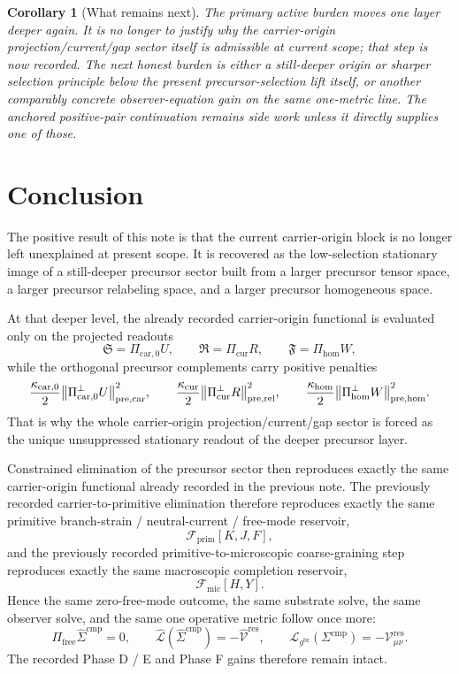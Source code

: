 \documentclass[11pt]{article}
\newcommand{\ObserverMetric}{g^{\mathrm{br}}}
\newcommand{\CompShift}{\Sigma^{\mathrm{cmp}}}
\newcommand{\CompLift}{\widehat\Sigma^{\mathrm{cmp}}}
\newcommand{\ResidualCore}{\mathcal V_{\mu\nu}^{\mathrm{res}}}
\newcommand{\ResidualLift}{\widehat{\mathcal V}^{\mathrm{res}}}
\newcommand{\SubReducedEin}{\widehat{\mathcal L}}
\newcommand{\FreeProj}{\Pi_{\mathrm{free}}}
\newcommand{\GaugeAux}{Y}
\newcommand{\ReducedEin}{\mathcal L_{\ObserverMetric}}
\newcommand{\MicFunctional}{\mathscr F_{\mathrm{mic}}}
\newcommand{\PrimFunctional}{\mathscr F_{\mathrm{prim}}}
\newcommand{\PrimStrain}{K}
\newcommand{\PrimNeutral}{J}
\newcommand{\PrimFree}{F}
\newcommand{\CarrierSeed}{\mathfrak S}
\newcommand{\RelabelSeed}{\mathfrak R}
\newcommand{\FreeSeed}{\mathfrak F}
\newcommand{\PreTensor}{U}
\newcommand{\PreRelabel}{R}
\newcommand{\PreFree}{W}
\newcommand{\PreCarProj}{\Pi_{\mathrm{car},0}}
\newcommand{\PreCarPerp}{\Pi_{\mathrm{car},0}^{\perp}}
\newcommand{\CurrentProj}{\Pi_{\mathrm{cur}}}
\newcommand{\CurrentPerp}{\Pi_{\mathrm{cur}}^{\perp}}
\newcommand{\FreeReadProj}{\Pi_{\mathrm{hom}}}
\newcommand{\FreeReadPerp}{\Pi_{\mathrm{hom}}^{\perp}}
\newcommand{\PreCarGap}{\kappa_{\mathrm{car},0}}
\newcommand{\CurrentGap}{\kappa_{\mathrm{cur}}}
\newcommand{\HomGap}{\kappa_{\mathrm{hom}}}
\newtheorem{corollary}{Corollary}
\begin{document}
\begin{corollary}[What remains next]
The primary active burden moves one layer deeper again. It is no longer to justify why the carrier-origin projection/current/gap sector itself is admissible at current scope; that step is now recorded. The next honest burden is either a still-deeper origin or sharper selection principle below the present precursor-selection lift itself, or another comparably concrete observer-equation gain on the same one-metric line. The anchored positive-pair continuation remains side work unless it directly supplies one of those.
\end{corollary}

\section{Conclusion}

The positive result of this note is that the current carrier-origin block is no longer left unexplained at present scope. It is recovered as the low-selection stationary image of a still-deeper precursor sector built from a larger precursor tensor space, a larger precursor relabeling space, and a larger precursor homogeneous space.

At that deeper level, the already recorded carrier-origin functional is evaluated only on the projected readouts
\[
\CarrierSeed=\PreCarProj\PreTensor,
\qquad
\RelabelSeed=\CurrentProj\PreRelabel,
\qquad
\FreeSeed=\FreeReadProj\PreFree,
\]
while the orthogonal precursor complements carry positive penalties
\[
\frac{\PreCarGap}{2}\norm{\PreCarPerp\PreTensor}_{\mathrm{pre,car}}^2,
\qquad
\frac{\CurrentGap}{2}\norm{\CurrentPerp\PreRelabel}_{\mathrm{pre,rel}}^2,
\qquad
\frac{\HomGap}{2}\norm{\FreeReadPerp\PreFree}_{\mathrm{pre,hom}}^2.
\]
That is why the whole carrier-origin projection/current/gap sector is forced as the unique unsuppressed stationary readout of the deeper precursor layer.

Constrained elimination of the precursor sector then reproduces exactly the same carrier-origin functional already recorded in the previous note. The previously recorded carrier-to-primitive elimination therefore reproduces exactly the same primitive branch-strain / neutral-current / free-mode reservoir,
\[
\PrimFunctional[\PrimStrain,\PrimNeutral,\PrimFree],
\]
and the previously recorded primitive-to-microscopic coarse-graining step reproduces exactly the same macroscopic completion reservoir,
\[
\MicFunctional[H,\GaugeAux].
\]
Hence the same zero-free-mode outcome, the same substrate solve, the same observer solve, and the same one operative metric follow once more:
\[
\FreeProj\CompLift=0,
\qquad
\SubReducedEin(\CompLift)=-\ResidualLift,
\qquad
\ReducedEin(\CompShift)=-\ResidualCore.
\]
The recorded Phase D / E and Phase F gains therefore remain intact.
\end{document}
